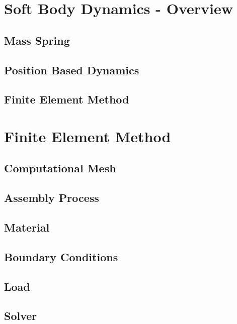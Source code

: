 \documentclass[en]{minipw} %
\begin{document}

\chapter{Soft Body Dynamics - Overview}

\section{Mass Spring}
\section{Position Based Dynamics}
\section{Finite Element Method}


\chapter{Finite Element Method}

\section{Computational Mesh}

\section{Assembly Process}

\section{Material}

\section{Boundary Conditions}

\section{Load}

\section{Solver}
\end{document}
